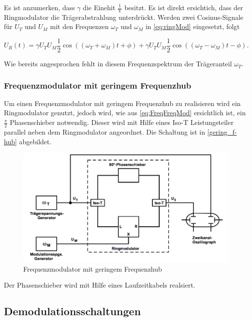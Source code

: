 Es ist anzumerken, dass $\gamma$ die Einehit $\frac{1}{\text{V}}$ besitzt. Es ist direkt ersichtich, dass der Ringmodulator die Trägerabstrahlung unterdrückt. Werden zwei Cosinus-Signale für $U_T$ und $U_M$ mit den Frequenzen $\omega_T$ und $\omega_M$ in \ref{eq:ringMod} eingesetzt, folgt

\begin{equation}
U_R(t) = \gamma U_T U_M \frac{1}{2}\cos((\omega_T + \omega_M)t + \phi) + \gamma U_T U_M \frac{1}{2} \cos((\omega_T - \omega_M)t - \phi).
\end{equation}

Wie bereits angesprochen fehlt in diesem Frequenzspektrum der Trägeranteil $\omega_T$.

\subsubsection{Frequenzmodulator mit geringem Frequenzhub}
Um einen Frequenzmodulator mit geringem Frequenzhub zu realisieren wird ein Ringmodulator genutzt, jedoch wird, wie aus \autoref{eq:FreqFreqMod} ersichtlich ist, ein $\frac{\pi}{2}$ Phasenschieber notwendig. Dieser wird mit Hilfe eines Iso-T Leistungsteiler parallel neben dem Ringmodulator angeordnet. Die Schaltung ist in \autoref{gering_f-hub} abgebildet.

\begin{figure}
	\centering
	\includegraphics[width=\textwidth]{img/Abb7.png}
	\caption{Frequenzmodulator mit geringem Frequenzhub \cite{FP}}
	\label{gering_f-hub}
\end{figure}

Der Phasenschieber wird mit Hilfe eines Laufzeitkabels realsiert.

\subsection{Demodulationsschaltungen}

